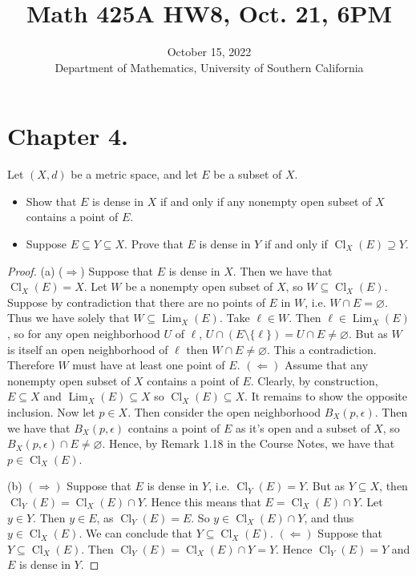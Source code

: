 \documentclass[10pt,reqno]{amsart}
\title{Math 425A HW8, Oct. 21, 6PM}
\date{October 15, 2022 \\ {Department of Mathematics, University of Southern California}}
\theoremstyle{definition}
\DeclareMathOperator{\Lim}{Lim}
\DeclareMathOperator{\Cl}{Cl}
\begin{document}
\maketitle
\setcounter{tocdepth}{4}
\setcounter{secnumdepth}{4}

\section{Chapter 4.}

\begin{tcolorbox}[colback=black!5!white,colframe=black!75!black,title= Chapter 4: Exercise $1.12.$] Let $(X, d)$ be a metric space, and let $E$ be a subset of $X$.
\begin{itemize}
	\item[(a)] Show that $E$ is dense in $X$ if and only if any nonempty open subset of $X$ contains a point of $E$.
	\item[(b)] Suppose $E \subseteq Y \subseteq X$. Prove that $E$ is dense in $Y$ if and only if $\Cl_X(E) \supseteq Y$.  
\end{itemize}
\tcblower 
\begin{proof} (a) ($\Rightarrow$) Suppose that $E$ is dense in $X$. Then we have that $\Cl_X(E) = X$. Let $W$ be a nonempty open subset of $X$, so $W \subseteq \Cl_X(E)$. Suppose by contradiction that there are no points of $E$ in $W$, i.e. $W \cap E = \varnothing$. Thus we have solely that $W \subseteq \Lim_X(E)$. Take $\ell \in W$. Then $\ell \in \Lim_X(E)$, so for any open neighborhood $U$ of $\ell$, $U \cap (E \setminus \{\ell \} )= U \cap E \neq \varnothing$. But as $W$ is itself an open neighborhood of $\ell$ then $W \cap E \neq \varnothing$. This a contradiction. Therefore $W$ must have at least one point of $E$. $(\Leftarrow)$ Assume that any nonempty open subset of $X$ contains a point of $E$. Clearly, by construction, $E \subseteq X$ and $\Lim_X(E) \subseteq X$ so $\Cl_X(E) \subseteq X$. It remains to show the opposite inclusion. Now let $p  \in X$. Then consider the open neighborhood $B_X(p, \epsilon)$. Then we have that $B_X(p, \epsilon)$ contains a point of $E$ as it's open and a subset of $X$, so $B_X(p, \epsilon) \cap E \neq \varnothing$. Hence, by Remark 1.18 in the Course Notes, we have that $p \in \Cl_X(E)$. 

(b) $(\Rightarrow)$ Suppose that $E$ is dense in $Y$, i.e. $\Cl_Y(E) = Y$. But as $Y \subseteq X$, then $\Cl_Y (E) = \Cl_X(E) \cap Y$. Hence this means that $E = \Cl_X(E) \cap Y$. Let $y \in Y$. Then $y \in E$, as $\Cl_Y(E) = E$. So $y \in \Cl_X(E) \cap Y$, and thus $y \in \Cl_X(E)$. We can conclude that $Y \subseteq \Cl_X(E)$. $(\Leftarrow)$ Suppose that $Y \subseteq \Cl_X(E)$. Then $\Cl_Y(E) = \Cl_X(E) \cap Y = Y$. Hence $\Cl_Y(E) = Y$ and $E$ is dense in $Y$.
\end{proof}

\end{tcolorbox}
\end{document}
